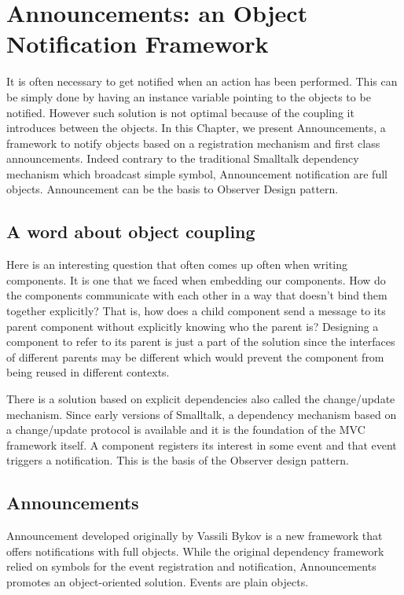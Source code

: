 \documentclass[a4paper,10pt,twoside]{book}
\begin{document}
\fi
\sloppy
\chapter{Announcements: an Object Notification Framework}



It is often necessary to get notified when an action has been performed. This can be simply done by having an instance variable pointing to the objects to be notified. However such solution is not optimal because of the coupling it introduces between the objects. In this Chapter, we present 
Announcements, a framework to notify objects based on a registration mechanism and first class announcements. Indeed contrary to the traditional Smalltalk dependency mechanism which broadcast simple symbol, Announcement notification are full objects. Announcement can be the basis to Observer Design pattern.


\section{A word about object coupling}
Here is an interesting question that often comes up often when writing
components. It is one that we faced when embedding our components. How
do the components communicate with each other in a way that doesn't
bind them together explicitly? That is, how does a child component
send a message to its parent component without explicitly knowing who
the parent is? Designing a component to refer to its parent is just a
part of the solution since the interfaces of different parents may be
different which would prevent the component from being reused in
different contexts.

There is a solution based on explicit dependencies also called the
change/update mechanism. Since early versions of Smalltalk, a
dependency mechanism based on a change/update protocol is available
and it is the foundation of the MVC framework itself. A component
registers its interest in some event and that event triggers a
notification. This is the basis of the Observer design pattern. 


\section{Announcements}
Announcement developed originally by Vassili Bykov is a new framework that offers notifications with full objects.  While the original dependency framework relied on symbols for the event registration and notification, Announcements promotes an object-oriented solution. Events are plain objects.
\end{document}
